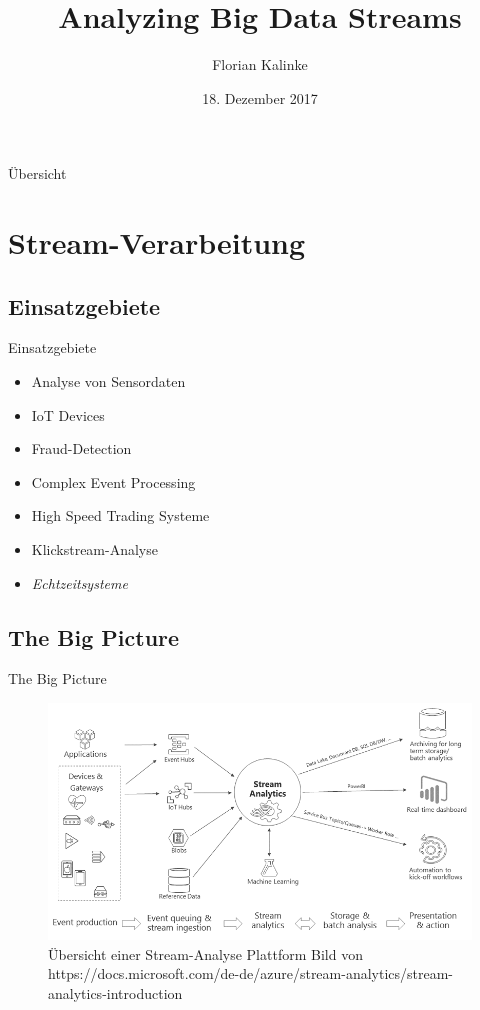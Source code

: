 \documentclass{beamer}
\title{Analyzing Big Data Streams}
\author{Florian Kalinke}
\date{18. Dezember 2017}
\begin{document}
\maketitle

\begin{frame}[t]{Übersicht}
  \vspace*{0.5cm}
  \renewcommand{\baselinestretch}{0.75}\normalsize
  \tableofcontents
  \renewcommand{\baselinestretch}{1.0}\normalsize
\end{frame}


\section{Stream-Verarbeitung}

\subsection{Einsatzgebiete}
\begin{frame}[t]{Einsatzgebiete}
  \begin{itemize}
    \item Analyse von Sensordaten
    \item IoT Devices
    \item Fraud-Detection
    \item Complex Event Processing
    \item High Speed Trading Systeme
    \item Klickstream-Analyse

    \item \textit{Echtzeitsysteme}
  \end{itemize}
\end{frame}

\subsection{The Big Picture}
\begin{frame}[t]{The Big Picture}
  \begin{figure}
    \centering
    \includegraphics[scale=0.4]{img/stream_analytics_intro_pipeline.png}
    \caption{Übersicht einer Stream-Analyse Plattform\hspace{\linewidth} Bild von https://docs.microsoft.com/de-de/azure/stream-analytics/stream-analytics-introduction }
  \end{figure}
\end{frame}
\end{document}
